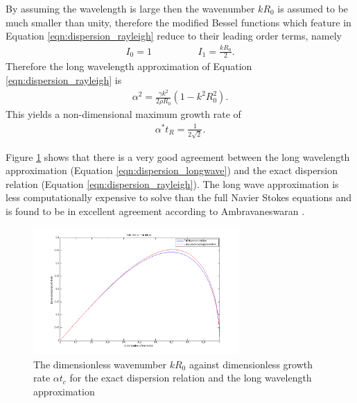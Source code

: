 \documentclass[11pt]{article}
\begin{document}
By assuming the wavelength is large then the wavenumber $kR_0$ is assumed to be much smaller than unity, therefore the modified Bessel functions which feature in Equation \ref{eqn:dispersion_rayleigh} reduce to their leading order terms, namely
\begin{align*}
I_0 = 1 \hspace{2cm} I_1 = \frac{kR_0}{2}.
\end{align*}
Therefore the long wavelength approximation of Equation \ref{eqn:dispersion_rayleigh} is
\begin{align}
\alpha^2 = \frac{\gamma k^2}{2 \rho R_0} (1 - k^2 R_0^2).
\label{eqn:dispersion_longwave}
\end{align}
This yields a non-dimensional maximum growth rate of 
\begin{align*}
\alpha^* t_R = \frac{1}{2 \sqrt{2}}.
\label{eqn:inviscid_max_growth}
\end{align*}
\begin{samepage}
Figure \ref{fig:dispersion_compare} shows that there is a very good agreement between the long wavelength approximation (Equation \ref{eqn:dispersion_longwave}) and the exact dispersion relation (Equation \ref{eqn:dispersion_rayleigh}). The long wave approximation is less computationally expensive to solve than the full Navier Stokes equations and is found to be in excellent agreement according to Ambravaneswaran \cite{ambravaneswaran2002drop}.
\end{samepage}
\begin{figure}[h]
\begin{center}
	\includegraphics[width = 0.7\textwidth]{img/dispersion_comparison.png}
	\caption{The dimensionless wavenumber $kR_0$ against dimensionless growth rate $\alpha t_c$ for the exact dispersion relation and the long wavelength approximation}
	\label{fig:dispersion_compare}
\end{center}
\end{figure} 
\end{document}
